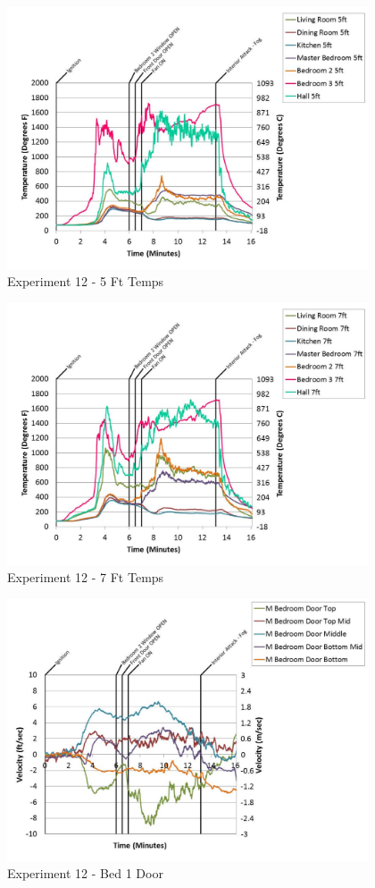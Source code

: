 \documentclass{article}
\begin{document}
\begin{appendices}
	\begin{figure}[h!]
		\centering
		\includegraphics[height=3.05in]{0_Images/Results_Charts/Exp_12_Charts/5FtTemps.pdf}
		\caption{Experiment 12 - 5 Ft Temps}
	\end{figure}
 

	\begin{figure}[h!]
		\centering
		\includegraphics[height=3.05in]{0_Images/Results_Charts/Exp_12_Charts/7FtTemps.pdf}
		\caption{Experiment 12 - 7 Ft Temps}
	\end{figure}
 
	\clearpage

	\begin{figure}[h!]
		\centering
		\includegraphics[height=3.05in]{0_Images/Results_Charts/Exp_12_Charts/Bed1Door.pdf}
		\caption{Experiment 12 - Bed 1 Door}
	\end{figure}
 


\end{appendices}
\end{document}
